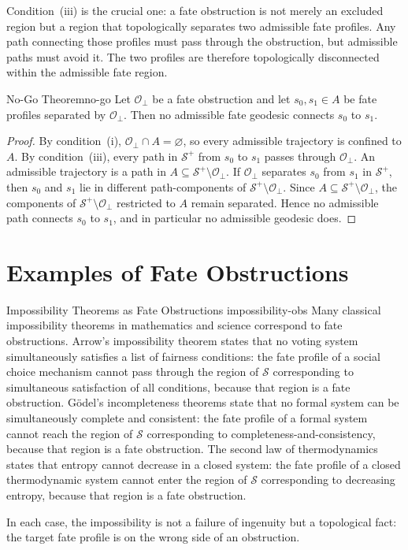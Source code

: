 \documentclass[12pt,twoside,openright]{book}
\newcommand{\fateSpace}{\mathcal{S}}
\newcommand{\admRegion}{A}
\providecommand{\fatePos}{\fateSpace^{+}}
\providecommand{\admRegion}{A}
\providecommand{\obstSet}{\mathcal{O}_{\perp}}
\begin{document}
Condition~(iii) is the crucial one: a fate obstruction is not
merely an excluded region but a region that topologically
separates two admissible fate profiles. Any path connecting
those profiles must pass through the obstruction, but admissible
paths must avoid it. The two profiles are therefore topologically
disconnected within the admissible fate region.

\begin{theorem}{No-Go Theorem}{no-go}
Let $\obstSet$ be a fate obstruction and let $s_0,s_1\in
\admRegion$ be fate profiles separated by $\obstSet$. Then no
admissible fate geodesic connects $s_0$ to $s_1$.
\begin{proof}
By condition~(i), $\obstSet\cap\admRegion=\varnothing$, so
every admissible trajectory is confined to $\admRegion$. By
condition~(iii), every path in $\fatePos$ from $s_0$ to $s_1$
passes through $\obstSet$. An admissible trajectory is a path
in $\admRegion\subseteq\fatePos\setminus\obstSet$.
If $\obstSet$ separates $s_0$ from $s_1$ in $\fatePos$, then
$s_0$ and $s_1$ lie in different path-components of
$\fatePos\setminus\obstSet$. Since $\admRegion\subseteq
\fatePos\setminus\obstSet$, the components of
$\fatePos\setminus\obstSet$ restricted to $\admRegion$
remain separated. Hence no admissible path connects $s_0$
to $s_1$, and in particular no admissible geodesic does.
\end{proof}
\end{theorem}

\section{Examples of Fate Obstructions}

\begin{remark}{Impossibility Theorems as Fate Obstructions}%
  {impossibility-obs}
Many classical impossibility theorems in mathematics and
science correspond to fate obstructions. Arrow's impossibility
theorem states that no voting system simultaneously satisfies
a list of fairness conditions: the fate profile of a social
choice mechanism cannot pass through the region of $\fateSpace$
corresponding to simultaneous satisfaction of all conditions,
because that region is a fate obstruction. G\"{o}del's
incompleteness theorems state that no formal system can be
simultaneously complete and consistent: the fate profile of a
formal system cannot reach the region of $\fateSpace$
corresponding to completeness-and-consistency, because that
region is a fate obstruction. The second law of thermodynamics
states that entropy cannot decrease in a closed system: the
fate profile of a closed thermodynamic system cannot enter the
region of $\fateSpace$ corresponding to decreasing entropy,
because that region is a fate obstruction.

In each case, the impossibility is not a failure of ingenuity
but a topological fact: the target fate profile is on the wrong
side of an obstruction.
\end{remark}
\end{document}

